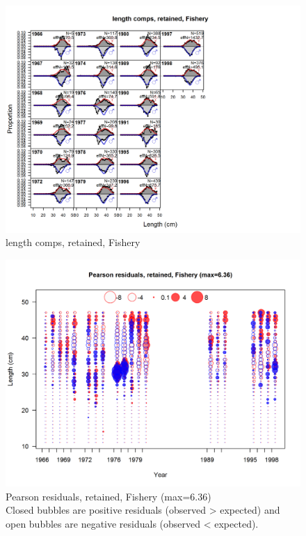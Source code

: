 \documentclass[12pt,]{article}
\begin{document}
\begin{figure}
\centering
\includegraphics{./r4ss/plots_mod1/comp_lenfit_flt1mkt2.png}
\caption{length comps, retained, Fishery
\label{fig:mod1_5_comp_lenfit_flt1mkt2}}
\end{figure}

\begin{figure}
\centering
\includegraphics{./r4ss/plots_mod1/comp_lenfit_residsflt1mkt2.png}
\caption{Pearson residuals, retained, Fishery (max=6.36)\\
Closed bubbles are positive residuals (observed \textgreater{} expected)
and open bubbles are negative residuals (observed \textless{} expected).
\label{fig:mod1_6_comp_lenfit_residsflt1mkt2}}
\end{figure}
\end{document}
